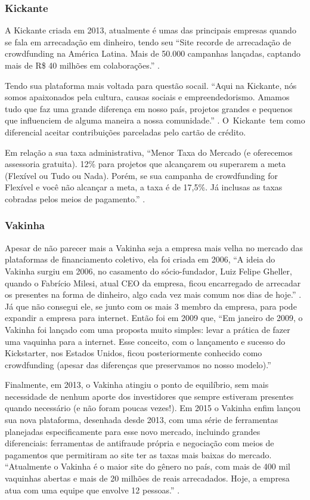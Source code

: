 \documentclass{classe_cn}                 %
\begin{document}
\subsubsection{Kickante}

A Kickante criada em 2013, atualmente é umas das principais empresas quando se fala em arrecadação em dinheiro, tendo seu “Site recorde de arrecadação de crowdfunding na América Latina. Mais de 50.000 campanhas lançadas, captando mais de R\$ 40 milhões em colaborações.” \cite{BRASIL:2017}.

Tendo sua plataforma mais voltada para questão socail. “Aqui na Kickante, nós somos apaixonados pela cultura, causas sociais e empreendedorismo. Amamos tudo que faz uma grande diferença em nosso país, projetos grandes e pequenos que influenciem de alguma maneira a nossa comunidade.” \cite{KICKANTE:2017}. O Kickante tem como diferencial aceitar contribuições parceladas pelo cartão de crédito.

Em relação a sua taxa administrativa, “Menor Taxa do Mercado (e oferecemos assessoria gratuita). 12\% para projetos que alcançarem ou superarem a meta (Flexível ou Tudo ou Nada). Porém, se sua campanha de crowdfunding for Flexível e você não alcançar a meta, a taxa é de 17,5\%. Já inclusas as taxas cobradas pelos meios de pagamento.”  \cite{BRASIL:2017}.

\subsubsection{Vakinha}

Apesar de não parecer mais a Vakinha seja a empresa mais velha no mercado das plataformas de financiamento coletivo, ela foi criada em 2006, “A ideia do Vakinha surgiu em 2006, no casamento do sócio-fundador, Luiz Felipe Gheller, quando o Fabrício Milesi, atual CEO da empresa, ficou encarregado de arrecadar os presentes na forma de dinheiro, algo cada vez mais comum nos dias de hoje.” \cite{VAKINHA:2017}. Já que não consegui ele, se junto com os mais 3 membro da empresa, para pode expandir a empresa para internet. Então foi em 2009 que, “Em janeiro de 2009, o Vakinha foi lançado com uma proposta muito simples: levar a prática de fazer uma vaquinha para a internet. Esse conceito, com o lançamento e sucesso do Kickstarter, nos Estados Unidos, ficou posteriormente conhecido como crowdfunding (apesar das diferenças que preservamos no nosso modelo).”

Finalmente, em 2013, o Vakinha atingiu o ponto de equilíbrio, sem mais necessidade de nenhum aporte dos investidores que sempre estiveram presentes quando necessário (e não foram poucas vezes!). Em 2015 o Vakinha enfim lançou sua nova plataforma, desenhada desde 2013, com uma série de ferramentas planejadas especificamente para esse novo mercado, incluindo grandes diferenciais: ferramentas de antifraude própria e negociação com meios de pagamentos que permitiram ao site ter as taxas mais baixas do mercado. “Atualmente o Vakinha é o maior site do gênero no país, com mais de 400 mil vaquinhas abertas e mais de 20 milhões de reais arrecadados. Hoje, a empresa atua com uma equipe que envolve 12 pessoas.” \cite{VAKINHA:2017}.
\end{document}
